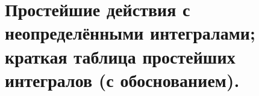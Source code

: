 \documentclass[../main.tex]{subfiles}
\begin{document}
\newpage
\section{Простейшие действия с неопределёнными интегралами; краткая таблица простейших интегралов (с обоснованием).}
\end{document}
